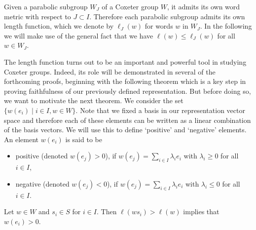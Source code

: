 Given a parabolic subgroup \(W_J\) of a Coxeter group \(W\), it admits its own word metric with respect to \(J\subset I\).
Therefore each parabolic subgroup admits its own length function, which we denote by \(\ell_J(w)\) for words \(w\) in \(W_J\).
In the following we will make use of the general fact that we have \(\ell(w) \leq \ell_J(w)\) for all \(w\in W_J\).

The length function turns out to be an important and powerful tool in studying Coxeter groups.
Indeed, its role will be demonstrated in several of the forthcoming proofs, beginning with the following theorem which is a key step in proving faithfulness of our previously defined representation.
But before doing so, we want to motivate the next theorem. %
We consider the set \(\{w(e_i) \;\vert\; i \in I, w \in W\}\).
Note that we fixed a basis in our representation vector space and therefore each of these elements can be written as a linear combination of the basis vectors.
We will use this to define `positive' and `negative' elements.
An element \(w(e_i)\) is said to be
\begin{itemize}
    \item positive (denoted \(w(e_j) > 0\)), if \(w(e_j) = \sum_{i \in I} \lambda_i e_i\) with \(\lambda_i \geq 0\) for all \(i \in I\),
    \item negative (denoted \(w(e_j) < 0\)), if \(w(e_j) = \sum_{i \in I} \lambda_i e_i\) with \(\lambda_i \leq 0\) for all \(i \in I\).
\end{itemize}

\begin{theorem}\label{thm:action}
    Let \(w\in W\) and \(s_i\in S\) for \(i\in I\).
    Then \(\ell(ws_i) > \ell(w)\) implies that \(w(e_i) > 0\).
\end{theorem}


